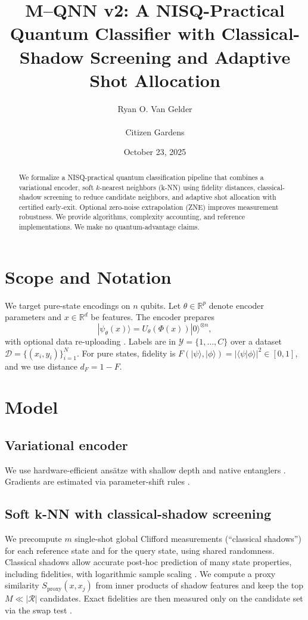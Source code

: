 \documentclass[11pt]{article}
\title{M--QNN v2: A NISQ-Practical Quantum Classifier with Classical-Shadow Screening and Adaptive Shot Allocation}
\author{Ryan O. Van Gelder \\ \\ Citizen Gardens}
\date{October 23, 2025}
\begin{document}
\maketitle

\begin{abstract}
We formalize a NISQ-practical quantum classification pipeline that combines a variational encoder, soft $k$-nearest neighbors (k-NN) using fidelity distances, classical-shadow screening to reduce candidate neighbors, and adaptive shot allocation with certified early-exit. Optional zero-noise extrapolation (ZNE) improves measurement robustness. We provide algorithms, complexity accounting, and reference implementations. We make no quantum-advantage claims.
\end{abstract}

\section{Scope and Notation}
We target pure-state encodings on $n$ qubits. Let $\theta \in \mathbb{R}^p$ denote encoder parameters and $x \in \mathbb{R}^d$ be features. The encoder prepares
\[
|\psi_\theta(x)\rangle = U_\theta(\Phi(x))|0\rangle^{\otimes n},
\]
with optional data re-uploading \citep{PerezSalinas2020}. Labels are in $\mathcal{Y}=\{1,\dots,C\}$ over a dataset $\mathcal{D}=\{(x_i,y_i)\}_{i=1}^N$. For pure states, fidelity is $F(|\psi\rangle,|\phi\rangle)=|\langle\psi|\phi\rangle|^2 \in [0,1]$, and we use distance $d_F=1-F$.

\section{Model}
\subsection{Variational encoder}
We use hardware-efficient ans\"atze with shallow depth and native entanglers \citep{Kandala2017}. Gradients are estimated via parameter-shift rules \citep{Schuld2019,Wierichs2022}.

\subsection{Soft k-NN with classical-shadow screening}
We precompute $m$ single-shot global Clifford measurements (``classical shadows'') for each reference state and for the query state, using shared randomness. Classical shadows allow accurate post-hoc prediction of many state properties, including fidelities, with logarithmic sample scaling \citep{Huang2020,ClassicalShadowsNoise}. We compute a proxy similarity $S_{\mathrm{proxy}}(x,x_j)$ from inner products of shadow features and keep the top $M \ll |\mathcal{R}|$ candidates. Exact fidelities are then measured only on the candidate set via the swap test \citep{Buhrman2001}.
\end{document}
